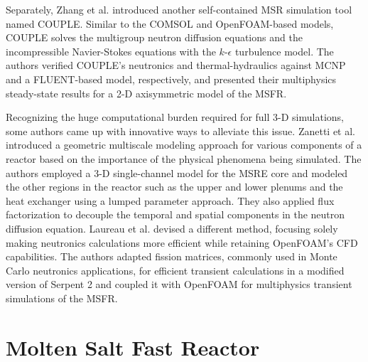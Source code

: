 Separately, Zhang et al. \cite{zhang_couple_2014} introduced another
self-contained \gls{MSR} simulation tool named COUPLE. Similar to the COMSOL
and OpenFOAM-based models, COUPLE solves the multigroup neutron diffusion
equations and the incompressible Navier-Stokes equations with the
$k$-$\epsilon$ turbulence model. The authors verified COUPLE's neutronics and
thermal-hydraulics against MCNP and a FLUENT-based model, respectively, and
presented their multiphysics steady-state results for a 2-D axisymmetric
model of the \gls{MSFR}.

Recognizing the huge computational burden required for full 3-D simulations, 
some authors came up with innovative ways to alleviate this issue. Zanetti et
al. \cite{zanetti_geometric_2015} introduced a geometric multiscale modeling
approach for various components of a reactor based on the importance of
the physical phenomena being simulated. The authors employed a 3-D 
single-channel model for the \gls{MSRE} core and modeled the other
regions in the reactor such as the upper and lower plenums and the heat
exchanger using a lumped parameter approach. They also applied flux
factorization to decouple the temporal and spatial components in the neutron
diffusion equation. Laureau et al. \cite{laureau_transient_2017} devised a
different method, focusing solely making neutronics calculations more
efficient while retaining OpenFOAM's \gls{CFD} capabilities. The authors
adapted fission matrices, commonly used in Monte Carlo neutronics
applications, for efficient transient calculations in a modified version of
Serpent 2 \cite{leppanen_serpent_2014} and coupled it with OpenFOAM for
multiphysics transient simulations of the \gls{MSFR}.

\section{Molten Salt Fast Reactor} \label{sec:msfr}

